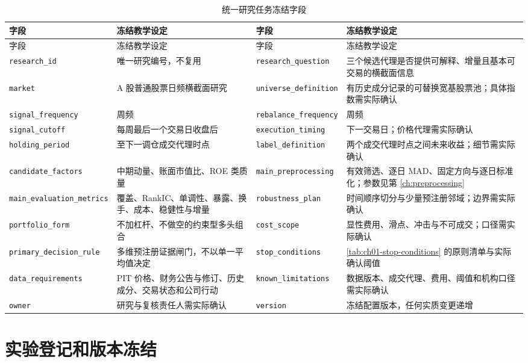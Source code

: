 \begingroup
\scriptsize
\setlength{\tabcolsep}{3pt}
\begin{longtable}{@{}p{2.55cm}p{4.95cm}p{2.55cm}p{4.95cm}@{}}
\caption{统一研究任务冻结字段}\label{tab:ch01-research-task}\\
\toprule
字段 & 冻结教学设定 & 字段 & 冻结教学设定 \\
\midrule
\endfirsthead
\toprule
字段 & 冻结教学设定 & 字段 & 冻结教学设定 \\
\midrule
\endhead
\texttt{research\_id} & 唯一研究编号，不复用 & \texttt{research\_question} & 三个候选代理是否提供可解释、增量且基本可交易的横截面信息 \\
\texttt{market} & A 股普通股票日频横截面研究 & \texttt{universe\_definition} & 有历史成分记录的可替换宽基股票池；具体指数需实际确认 \\
\texttt{signal\_frequency} & 周频 & \texttt{rebalance\_frequency} & 周频 \\
\texttt{signal\_cutoff} & 每周最后一个交易日收盘后 & \texttt{execution\_timing} & 下一交易日；价格代理需实际确认 \\
\texttt{holding\_period} & 至下一调仓成交代理时点 & \texttt{label\_definition} & 两个成交代理时点之间未来收益；细节需实际确认 \\
\texttt{candidate\_factors} & 中期动量、账面市值比、ROE 类质量 & \texttt{main\_preprocessing} & 有效筛选、逐日 MAD、固定方向与逐日标准化；参数见第 \cref{ch:preprocessing} \\
\texttt{main\_evaluation\_metrics} & 覆盖、RankIC、单调性、暴露、换手、成本、稳健性与增量 & \texttt{robustness\_plan} & 时间顺序切分与少量预注册邻域；边界需实际确认 \\
\texttt{portfolio\_form} & 不加杠杆、不做空的约束型多头组合 & \texttt{cost\_scope} & 显性费用、滑点、冲击与不可成交；口径需实际确认 \\
\texttt{primary\_decision\_rule} & 多维预注册证据闸门，不以单一平均值决定 & \texttt{stop\_conditions} & \cref{tab:ch01-stop-conditions} 的原则清单与实际确认阈值 \\
\texttt{data\_requirements} & PIT 价格、财务公告与修订、历史成分、交易状态和公司行动 & \texttt{known\_limitations} & 数据版本、成交代理、费用、阈值和机构口径需实际确认 \\
\texttt{owner} & 研究与复核责任人需实际确认 & \texttt{version} & 冻结配置版本，任何实质变更递增 \\
\bottomrule
\end{longtable}
\endgroup

\section{实验登记和版本冻结}

